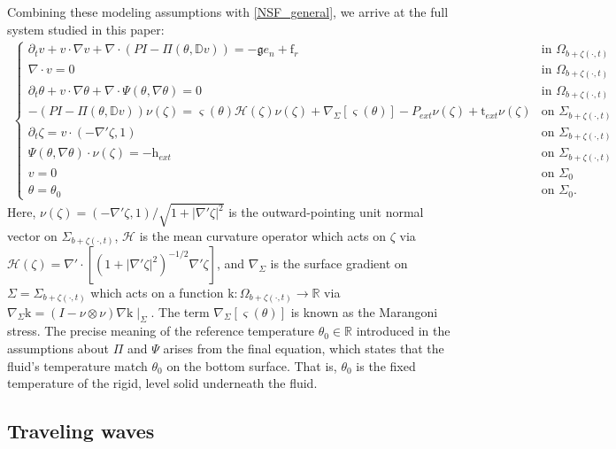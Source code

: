 \documentclass[11pt,letterpaper,reqno]{amsart}
\numberwithin{equation}{section}
\begin{document}
Combining these modeling assumptions with \eqref{NSF_general}, we arrive at the full system studied in this paper:
\begin{align} \label{eqns}
    \begin{cases}
        \partial_{t}v + v \cdot \nabla v + \nabla \cdot (PI - \Pi(\theta,\mathbb{D} v))= - \mathfrak{g} e_{n}+\mathrm{f}_{r} & \mbox{in \(\Omega_{b+\zeta(\cdot,t)}\)} \\
        \nabla \cdot v = 0 &\mbox{in \(\Omega_{b+\zeta(\cdot,t)}\)} \\
        \partial_{t}\theta+ v \cdot \nabla \theta + \nabla \cdot \Psi(\theta,\nabla\theta) = 0 &\mbox{in \(\Omega_{b+\zeta(\cdot,t)}\)} \\
        -(PI - \Pi(\theta,\mathbb{D} v)) \nu(\zeta) = \varsigma(\theta)\mathcal{H}(\zeta)\nu(\zeta) + \nabla_{\Sigma}[\varsigma(\theta)]-P_{ext}\nu(\zeta)+\mathrm{t}_{ext} \nu(\zeta) &\mbox{on \(\Sigma_{b+\zeta(\cdot,t)}\)} \\
        \partial_{t}\zeta= v \cdot (-\nabla'\zeta,1) &\mbox{on \(\Sigma_{b+\zeta(\cdot,t)}\)} \\
        \Psi(\theta,\nabla\theta) \cdot \nu(\zeta) = -\mathrm{h}_{ext} &\mbox{on \(\Sigma_{b+\zeta(\cdot,t)}\)} \\
        v=0 &\mbox{on \(\Sigma_{0}\)} \\
        \theta=\theta_0 &\mbox{on \(\Sigma_{0}\)}.
    \end{cases}
\end{align}
Here, \(\nu(\zeta)=(-\nabla' \zeta,1)/\sqrt{1+\lvert\nabla' \zeta\rvert^{2}}\) is the outward-pointing unit normal vector on \(\Sigma_{b+\zeta(\cdot,t)}\), \(\mathcal{H}\) is the mean curvature operator which acts on \(\zeta\) via $\mathcal{H}(\zeta)=\nabla' \cdot [ (1+\lvert\nabla' \zeta\rvert^{2})^{-1/2}\nabla' \zeta ]$, and \(\nabla_{\Sigma}\) is the surface gradient on \(\Sigma=\Sigma_{b+\zeta(\cdot,t)}\) which acts on a function \(\mathrm{k}: \Omega_{b+\zeta(\cdot,t)} \to \mathbb{R}\) via \(\nabla_{\Sigma}\mathrm{k}=(I-\nu \otimes \nu)\nabla \mathrm{k} \mid_{\Sigma}\). The term $\nabla_{\Sigma}[\varsigma(\theta)]$ is known as the Marangoni stress. The precise meaning of the reference temperature $\theta_0 \in \mathbb{R}$ introduced in the assumptions about $\Pi$ and $\Psi$ arises from the final equation, which states that the fluid's temperature match $\theta_0$ on the bottom surface. That is, $\theta_0$ is the fixed temperature of the rigid, level solid underneath the fluid.


\subsection{Traveling waves}\label{sec_intro_tw}
\end{document}

